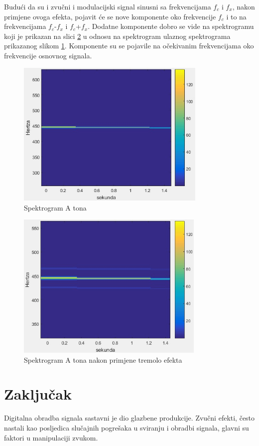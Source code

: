 \documentclass[conference]{IEEEtran}
\begin{document}
Budući da su i zvučni i modulacijski signal sinusni sa frekvencijama $f_{c}$ i $f_{x}$, nakon primjene ovoga efekta, pojavit
će se nove komponente oko frekvencije $f_{c}$ i to na frekvencijama $f_{c}$-$f_{x}$ i $f_{c}$+$f_{x}$. Dodatne komponente
dobro se vide na
spektrogramu koji je prikazan na slici \ref{tremolo_izlaz} u odnosu na spektrogram ulaznog spektrograma prikazanog
slikom \ref{tremolo_ulaz}. Komponente su se pojavile na očekivanim frekvencijama oko frekvencije osnovnog
signala.

\begin{figure}[H]
   \centerline{\includegraphics[height=200pt]{slike/tremolo_ulaz.jpeg}}
   \caption{Spektrogram A tona}
   \label{tremolo_ulaz}
 \end{figure}

 \begin{figure}[H]
   \centerline{\includegraphics[height=200pt]{slike/tremolo_izlaz.jpeg}}
   \caption{Spektrogram A tona nakon primjene tremolo efekta}
   \label{tremolo_izlaz}
 \end{figure}

\section{Zaključak}
Digitalna obradba signala sastavni je dio glazbene produkcije. Zvučni efekti, često nastali kao
posljedica slučajnih pogrešaka u sviranju i obradbi signala, glavni su faktori u manipulaciji zvukom.
\end{document}
